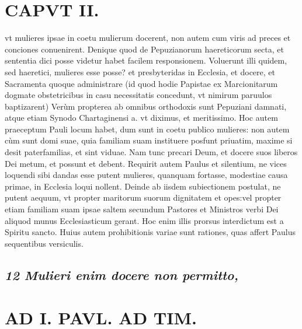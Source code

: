 \documentclass{article}
\begin{document}
\begin{pages}
\section*{CAPVT II. }
\marginpar{[ p.83 ]}vt mulieres ipsae in coetu mulierum docerent, non autem cum viris ad preces et conciones conuenirent. \pstart Denique quod de Pepuzianorum haereticorum secta, et sententia dici posse videtur habet facilem responsionem. Voluerunt illi quidem, sed haeretici, mulieres esse posse? et presbyteridas in Ecclesia, et docere, et Sacramenta quoque administrare (id quod hodie Papistae ex Marcionitarum dogmate obstetricibus in casu necessitatis concedunt, vt nimirum paruulos baptizarent) Verùm propterea ab omnibus orthodoxis sunt Pepuziani damnati, atque etiam Synodo Chartaginensi a. vt diximus, et meritissimo.  \pend\pstart Hoc autem praeceptum Pauli locum habet, dum sunt in coetu publico mulieres: non autem cùm sunt domi suae, quia familiam suam instituere posfunt priuatim, maxime si desit paterfamilias, et sint viduae. Nam tunc precari Deum, et docere suos liberos Dei metum, et possunt et debent.  \pend\pstart Requirit autem Paulus et silentium, ne vices loquendi sibi dandas esse putent mulieres, quanquam fortasse, modestiae causa primae, in Ecclesia loqui nollent. Deinde ab iisdem subiectionem postulat, ne putent aequum, vt propter maritorum suorum dignitatem et opes:vel propter etiam familiam suam ipsae saltem secundum Pastores et Ministros verbi Dei aliquod munus Ecclesiasticum gerant. Hoc enim illis prorsus interdictum est a Spiritu sancto. Huius autem prohibitionis variae sunt rationes, quas affert Paulus sequentibus  versiculis.  \pend
{}
{}
\subsection*{\textit{12 Mulieri enim docere non permitto, }}
\section*{AD I. PAVL. AD TIM. }
\marginpar{[ p.84 ]}
{}

\end{pages}
\end{document}
